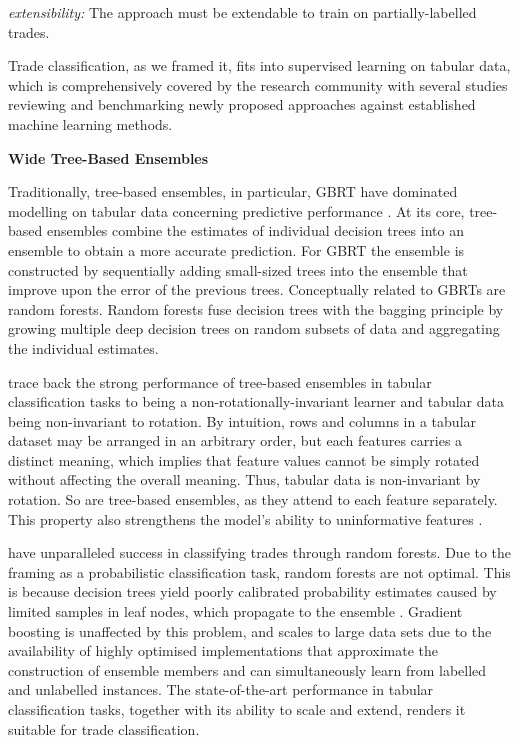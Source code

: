 \emph{extensibility:} The approach must be extendable to train on partially-labelled trades.

Trade classification, as we framed it, fits into supervised learning on tabular data, which is comprehensively covered by the research community with several studies reviewing and benchmarking newly proposed approaches against established machine learning methods.

\textbf{Wide Tree-Based Ensembles}

Traditionally, tree-based ensembles, in particular, \gls{GBRT} have dominated modelling on tabular data concerning predictive performance \autocites[][24--25]{grinsztajnWhyTreebasedModels2022}[][7]{kadraWelltunedSimpleNets2021}[][8]{gorishniyRevisitingDeepLearning2021}. At its core, tree-based ensembles combine the estimates of individual decision trees into an ensemble to obtain a more accurate prediction. For \gls{GBRT} \autocite[][9]{friedmanGreedyFunctionApproximation2001} the ensemble is constructed by sequentially adding small-sized trees into the ensemble that improve upon the error of the previous trees. Conceptually related to \glspl{GBRT} are random forests. Random forests \autocite[][6]{breimanRandomForests2001} fuse decision trees with the bagging principle \autocite[][123]{breimanBaggingPredictors1996} by growing multiple deep decision trees on random subsets of data and aggregating the individual estimates. 

\textcite[][7-9]{grinsztajnWhyTreebasedModels2022} trace back the strong performance of tree-based ensembles in tabular classification tasks to being a non-rotationally-invariant learner and tabular data being non-invariant to rotation. By intuition, rows and columns in a tabular dataset may be arranged in an arbitrary order, but each features carries a distinct meaning, which implies that feature values cannot be simply rotated without affecting the overall meaning. Thus, tabular data is non-invariant by rotation. So are tree-based ensembles, as they attend to each feature separately. This property also strengthens the model's ability to uninformative features \autocite[][8-9]{grinsztajnWhyTreebasedModels2022}.

\textcite[][13--14]{ronenMachineLearningTrade2022} have unparalleled success in classifying trades through random forests. Due to the framing as a probabilistic classification task, random forests are not optimal. This is because decision trees yield poorly calibrated probability estimates caused by limited samples in leaf nodes, which propagate to the ensemble \autocite[][356--360]{tanhaSemisupervisedSelftrainingDecision2017}. Gradient boosting is unaffected by this problem, and scales to large data sets due to the availability of highly optimised implementations that approximate the construction of ensemble members and can simultaneously learn from labelled and unlabelled instances. The state-of-the-art performance in tabular classification tasks, together with its ability to scale and extend, renders it suitable for trade classification.


